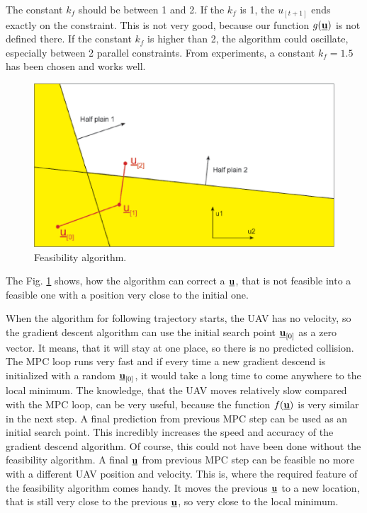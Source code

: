 \documentclass[a4paper,11pt,titlepage]{article}
\newcommand{\uvec}{\textbf{\underline{u}}}
\newcommand{\macf}{f(\uvec)}
\newcommand{\macg}{g(\uvec)}
\begin{document}
The constant $k_f$ should be between 1 and 2. If the $k_f$ is 1, the $u_{[t+1]}$ ends exactly on the constraint. This is not very good, because our function $\macg$ is not defined there. If the constant $k_f$ is higher than 2, the algorithm could oscillate, especially between 2 parallel constraints. From experiments, a constant $k_f = 1.5$ has been chosen and works well.

\begin{figure}[!ht]
\includegraphics[width=1\textwidth]{fig/feasibility_paint.eps}
\caption{Feasibility algorithm.}
\label{fig:feasibility_algorithm}
\end{figure}


The Fig. \ref{fig:feasibility_algorithm} shows, how the algorithm can correct a $\uvec$, that is not feasible into a feasible one with a position very close to the initial one. 

When the algorithm for following trajectory starts, the UAV has no velocity, so the gradient descent algorithm can use the initial search point $\uvec_{[0]}$ as a zero vector. It means, that it will stay at one place, so there is no predicted collision. The MPC loop runs very fast and if every time a new gradient descend is initialized with a random $\uvec_{[0]}$, it would take a long time to come anywhere to the local minimum. The knowledge, that the UAV moves relatively slow compared with the MPC loop, can be very useful, because the function $\macf$ is very similar in the next step. A final prediction from previous MPC step can be used as an initial search point. This incredibly increases the speed and accuracy of the gradient descend algorithm. Of course, this could not have been done without the feasibility algorithm. A final $\uvec$ from previous MPC step can be feasible no more with a different UAV position and velocity. This is, where the required feature of the feasibility algorithm comes handy. It moves the previous $\uvec$ to a new location, that is still very close to the previous $\uvec$, so very close to the local minimum. 
\end{document}
